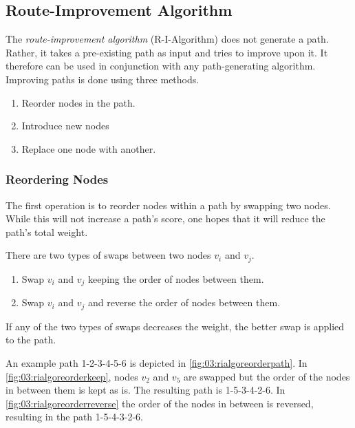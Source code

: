 \subsection{Route-Improvement Algorithm}
\label{subsec:03:rialgo}

The \emph{route-improvement algorithm} (R-I-Algorithm) does not generate a path.
Rather, it takes a pre-existing path as input and tries to improve upon it.
It therefore can be used in conjunction with any path-generating algorithm.
Improving paths is done using three methods.

\begin{enumerate}
    \item Reorder nodes in the path.
    \item Introduce new nodes
    \item Replace one node with another.
\end{enumerate}

\subsubsection{Reordering Nodes}
\label{subsubsec:03:reorder}

The first operation is to reorder nodes within a path by swapping two nodes.
While this will not increase a path's score, one hopes that it will reduce the path's total weight.

There are two types of swaps between two nodes $v_i$ and $v_j$.
\begin{enumerate}
    \item Swap $v_i$ and $v_j$ keeping the order of nodes between them.
    \item Swap $v_i$ and $v_j$ and reverse the order of nodes between them.
\end{enumerate} 
If any of the two types of swaps decreases the weight, the better swap is applied to the path.

An example path 1-2-3-4-5-6 is depicted in \cref{fig:03:rialgoreorderpath}.
In \cref{fig:03:rialgoreorderkeep}, nodes $v_2$ and $v_5$ are swapped but the order of the nodes in between them is kept as is.
The resulting path is 1-5-3-4-2-6.
In \cref{fig:03:rialgoreorderreverse} the order of the nodes in between is reversed, resulting in the path 1-5-4-3-2-6. 

